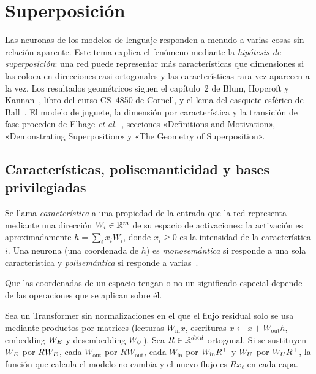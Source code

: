 \chapter{Superposición}
\label{tema:3}

Las neuronas de los modelos de lenguaje responden a menudo a varias cosas sin relación aparente. Este tema explica el fenómeno mediante la \emph{hipótesis de superposición}: una red puede representar más características que dimensiones si las coloca en direcciones casi ortogonales y las características rara vez aparecen a la vez. Los resultados geométricos siguen el capítulo~2 de Blum, Hopcroft y Kannan~\cite{bhk}, libro del curso CS~4850 de Cornell, y el lema del casquete esférico de Ball~\cite{ball}. El modelo de juguete, la dimensión por característica y la transición de fase proceden de Elhage \emph{et al.}~\cite{elhage22}, secciones «Definitions and Motivation», «Demonstrating Superposition» y «The Geometry of Superposition».

\section{Características, polisemanticidad y bases privilegiadas}

\begin{definicion}\label{def:caracteristica}
Se llama \emph{característica} a una propiedad de la entrada que la red representa mediante una dirección $W_i\in\mathbb{R}^{m}$ de su espacio de activaciones: la activación es aproximadamente $h=\sum_ix_iW_i$, donde $x_i\ge 0$ es la intensidad de la característica $i$. Una neurona (una coordenada de $h$) es \emph{monosemántica} si responde a una sola característica y \emph{polisemántica} si responde a varias~\cite[«What are Features?» y «Features as Directions»]{elhage22}.
\end{definicion}

Que las coordenadas de un espacio tengan o no un significado especial depende de las operaciones que se aplican sobre él.

\begin{proposicion}\label{prop:rotacion}
Sea un Transformer sin normalizaciones en el que el flujo residual solo se usa mediante productos por matrices (lecturas $W_{\mathrm{in}}x$, escrituras $x\leftarrow x+W_{\mathrm{out}}h$, embedding $W_{E}$ y desembedding $W_{U}$). Sea $R\in\mathbb{R}^{d\times d}$ ortogonal. Si se sustituyen $W_{E}$ por $RW_{E}$, cada $W_{\mathrm{out}}$ por $RW_{\mathrm{out}}$, cada $W_{\mathrm{in}}$ por $W_{\mathrm{in}}R^{\top}$ y $W_{U}$ por $W_{U} R^{\top}$, la función que calcula el modelo no cambia y el nuevo flujo es $Rx_\ell$ en cada capa.
\end{proposicion}

